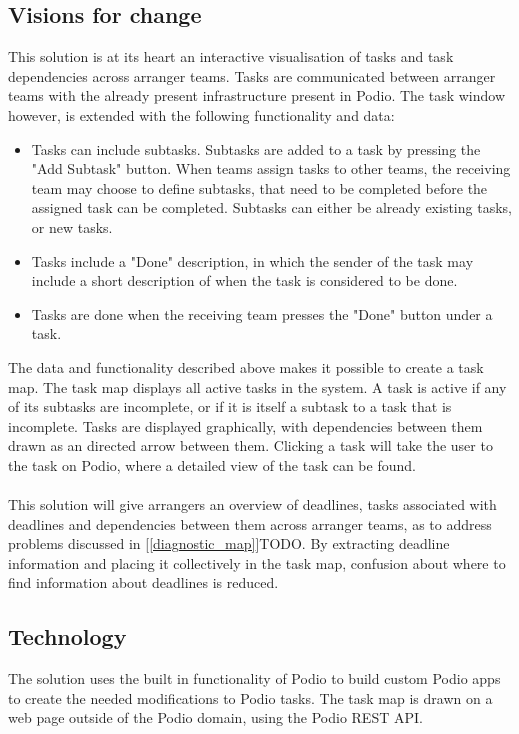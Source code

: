 \subsection{Visions for change}
\label{visions_for_change}
This solution is at its heart an interactive visualisation of tasks and task dependencies across arranger teams. Tasks are communicated between arranger teams with the already present infrastructure present in Podio. The task window however, is extended with the following functionality and data:
\begin{itemize}
    \item Tasks can include subtasks. Subtasks are added to a task by pressing the "Add Subtask" button. When teams assign tasks to other teams, the receiving team may choose to define subtasks, that need to be completed before the assigned task can be completed. Subtasks can either be already existing tasks, or new tasks.
    \item Tasks include a "Done" description, in which the sender of the task may include a short description of when the task is considered to be done.
    \item Tasks are done when the receiving team presses the "Done" button under a task.
\end{itemize}
The data and functionality described above makes it possible to create a task map. The task map displays all active tasks in the system. A task is active if any of its subtasks are incomplete, or if it is itself a subtask to a task that is incomplete. Tasks are displayed graphically, with dependencies between them drawn as an directed arrow between them. Clicking a task will take the user to the task on Podio, where a detailed view of the task can be found. 
\\ \\
This solution will give arrangers an overview of deadlines, tasks associated with deadlines and
dependencies between them across arranger teams, as to address problems discussed in
 [\ref{diagnostic_map}]TODO. By extracting deadline information and placing it collectively in the task map, confusion about where to find information about deadlines is reduced.

\subsection{Technology}
\label{sub:technology}
The solution uses the built in functionality of Podio to build custom Podio apps to create the needed modifications to Podio tasks. The task map is drawn on a web page outside of the Podio domain, using the Podio REST API.

